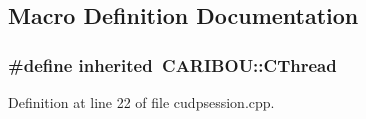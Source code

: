 \subsection{Macro Definition Documentation}
\subsubsection[{inherited}]{\setlength{\rightskip}{0pt plus 5cm}\#define inherited~{\bf C\-A\-R\-I\-B\-O\-U\-::\-C\-Thread}}\label{cudpsession_8cpp_a3920e3b7cb0909b941b2409493acf8f1}


Definition at line 22 of file cudpsession.\-cpp.

